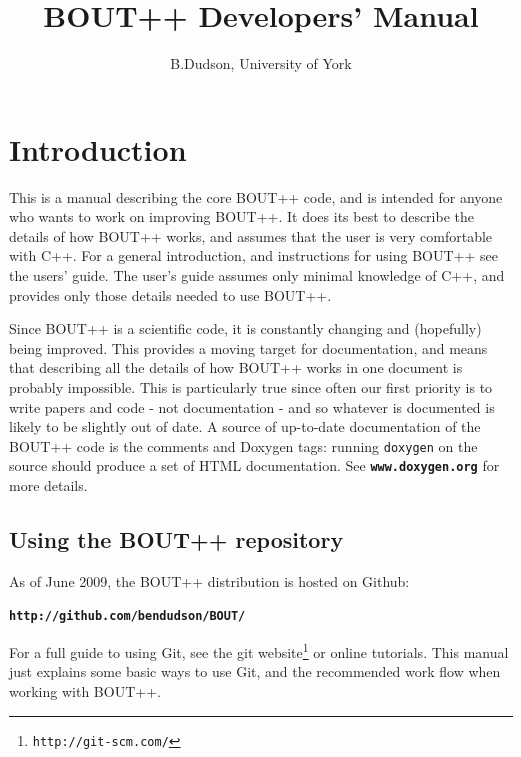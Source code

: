 \documentclass[12pt]{article}
\newcommand{\code}[1]{\texttt{#1}}
\newcommand{\file}[1]{\texttt{\bf #1}}
\begin{document}
\title{BOUT++ Developers' Manual}
\author{B.Dudson, University of York}

\maketitle

\tableofcontents

\section{Introduction}

This is a manual describing the core BOUT++ code\cite{Dudson2009,dudson-2008-arxiv},
and is intended for anyone who
wants to work on improving BOUT++. It does its best to describe
the details of how BOUT++ works, and assumes that the user is very comfortable
with C++. For a general introduction, and instructions for using BOUT++
see the users' guide. The user's guide assumes only minimal knowledge of C++,
and provides only those details needed to use BOUT++. 

Since BOUT++ is a scientific code, it is constantly changing and (hopefully)
being improved. This provides a moving target for documentation, and means
that describing all the details of how BOUT++ works in one document is probably
impossible. This is particularly true since often our first priority is to
write papers and code - not documentation - and so whatever is documented
is likely to be slightly out of date. A source of up-to-date documentation
of the BOUT++ code is the comments and Doxygen tags: running \code{doxygen}
on the source should produce a set of HTML documentation. See
\file{www.doxygen.org} for more details.

\subsection{Using the BOUT++ repository}

As of June 2009, the BOUT++ distribution is hosted on Github: 

\file{http://github.com/bendudson/BOUT/}

For a full guide to using Git, see the git website\footnote{\texttt{http://git-scm.com/}} or
online tutorials. This manual just explains some basic ways to use Git, and the recommended work flow
when working with BOUT++.
\end{document}

